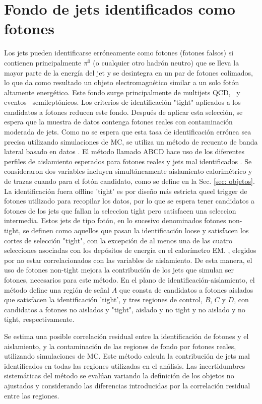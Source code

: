 \section{Fondo de jets identificados como fotones}

Los jets pueden identificarse erróneamente como fotones (fotones falsos) si contienen principalmente $\pi^{0}$ (o cualquier otro hadrón neutro) que se lleva la mayor parte de la
energía del jet y se desintegra en un par de fotones colimados, lo que da como resultado un objeto electromagnético
similar a un solo fotón altamente energético.
Este fondo surge principalmente de multijets QCD, \wj\ y eventos \ttbar\ semileptónicos. Los criterios de identificación "tight" aplicados a los candidatos a fotones reducen este fondo. Después de aplicar esta selección, se espera que la muestra de datos contenga fotones reales con contaminación moderada de jets. Como no se espera que esta tasa de identificación errónea sea precisa
utilizando simulaciones de MC, se utiliza un método de recuento de banda lateral basado en datos \cite{ATLAS: 2020uiq}. El método llamado ABCD hace uso de los diferentes perfiles de aislamiento esperados para fotones reales y jets mal identificados \cite{STDM-2010-08}.
Se consideraron dos variables incluyen simultáneamente aislamiento calorimétrico y de trazas cuando para el fotón candidato, como se define en la Sec. \ref{sec: objetos}.
La identificación fuera offline 'tight' es por diseño más estricta queel trigger de fotones utilizado para recopilar los datos, por lo que se espera tener candidatos a fotones
de los jets que fallan la seleccion tight pero satisfacen una seleccion intermedia. Estos jets de tipo fotón, en lo sucesivo denominados fotones non-tight, se definen como aquellos que pasan la identificación loose y satisfacen los cortes de selección "tight", con la excepción de al menos una de las cuatro selecciones asociadas con los depósitos de energía en el calorímetro EM. \cite{ATLAS: 2020uiq}, elegidos por no estar correlacionados con las variables de aislamiento. De esta manera, el uso de fotones non-tight mejora la contribución de los jets que simulan ser fotones, necesarios para este método.
En el plano de identificación-aislamiento, el método define una región de señal $A$ que consta de candidatos a fotones aislados que satisfacen la identificación 'tight', y tres regiones de control, $B$, $C$ y $D$, con candidatos a fotones no aislados y "tight", aislado y no tight y no aislado y no tight, respectivamente.

Se estima una posible correlación residual entre la identificación de fotones y el aislamiento, y la contaminación de las regiones de fondo por fotones reales, utilizando simulaciones de MC. Este método calcula la contribución de jets mal identificados en todas las regiones utilizadas en el análisis. Las incertidumbres sistemáticas del método se evalúan variando la definición de los objetos no ajustados y considerando las diferencias introducidas por la correlación residual entre las regiones.

